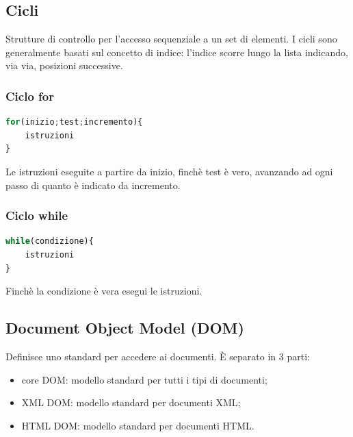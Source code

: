\documentclass{article}
\begin{document}
\subsection{Cicli}
Strutture di controllo per l'accesso sequenziale a un set di elementi. I cicli sono generalmente basati sul concetto di indice: l'indice scorre lungo la lista indicando, via via, posizioni successive.
\subsubsection{Ciclo for}
\begin{lstlisting}[language=JavaScript]
for(inizio;test;incremento){
    istruzioni
}
\end{lstlisting}
Le istruzioni eseguite a partire da inizio, finchè test è vero, avanzando ad ogni passo di quanto è indicato da incremento.
\subsubsection{Ciclo while}
\begin{lstlisting}[language=JavaScript]
while(condizione){
    istruzioni
}
\end{lstlisting}
Finchè la condizione è vera esegui le istruzioni.
\subsection{Document Object Model (DOM)}
Definisce uno standard per accedere ai documenti. È separato in 3 parti:
\begin{itemize}
    \item core DOM: modello standard per tutti i tipi di documenti;
    \item XML DOM: modello standard per documenti XML;
    \item HTML DOM: modello standard per documenti HTML.
\end{itemize}
\end{document}
